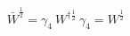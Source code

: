 \begin{equation}
\bar{W}^{\frac{1}{2}}=\gamma_4~W^{\dag\frac{1}{2}}~\gamma_4= W^{\frac{1}{2}}
\end{equation}

